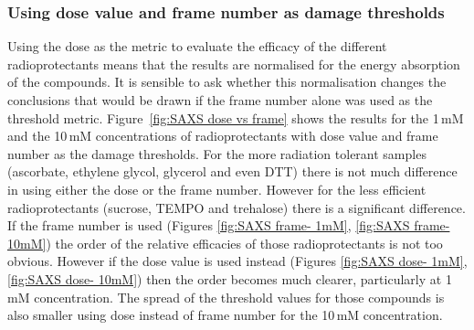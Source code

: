 \subsubsection{Using dose value and frame number as damage thresholds}
\label{subs:Using dose value and frame number as damage thresholds}
Using the dose as the metric to evaluate the efficacy of the different radioprotectants means that the results are normalised for the energy absorption of the compounds. It is sensible to ask whether this normalisation changes the conclusions that would be drawn if the frame number alone was used as the threshold metric.
Figure~\ref{fig:SAXS dose vs frame} shows the results for the 1\,mM and the 10\,mM concentrations of radioprotectants with dose value and frame number as the damage thresholds.
For the more radiation tolerant samples (ascorbate, ethylene glycol, glycerol and even DTT) there is not much difference in using either the dose or the frame number.
However for the less efficient radioprotectants (sucrose, TEMPO and trehalose) there is a significant difference.
If the frame number is used (Figures \ref{fig:SAXS frame- 1mM}, \ref{fig:SAXS frame- 10mM}) the order of the relative efficacies of those radioprotectants is not too obvious.
However if the dose value is used instead (Figures \ref{fig:SAXS dose- 1mM}, \ref{fig:SAXS dose- 10mM}) then the order becomes much clearer, particularly at 1\,mM concentration.
The spread of the threshold values for those compounds is also smaller using dose instead of frame number for the 10\,mM concentration.
